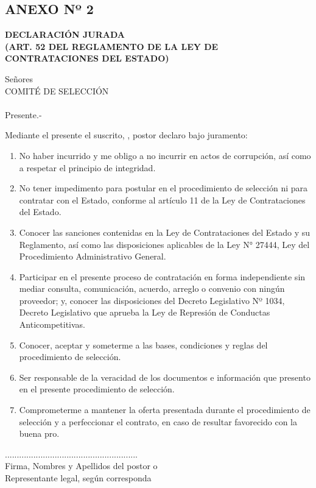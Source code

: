 \begin{center}
    \section*{ANEXO Nº 2}
    \textbf{DECLARACIÓN JURADA \\ (ART. 52 DEL REGLAMENTO DE LA LEY DE CONTRATACIONES DEL ESTADO)}
\end{center}
    
    Señores \\
    COMITÉ DE SELECCIÓN \\
    \nomenclatura \\
    Presente.-
    
    \vspace{0.5cm}
    
    Mediante el presente el suscrito, \textbf{\representante}, postor 
    declaro bajo juramento:
    
    \begin{enumerate}[label=\roman*.] %
        \item No haber incurrido y me obligo a no incurrir en actos de corrupción, así como a respetar el principio de integridad.
        \item No tener impedimento para postular en el procedimiento de selección ni para contratar con el Estado, conforme al artículo 11 de la Ley de Contrataciones del Estado.
        \item Conocer las sanciones contenidas en la Ley de Contrataciones del Estado y su Reglamento, así como las disposiciones aplicables de la Ley N° 27444, Ley del Procedimiento Administrativo General.
        \item Participar en el presente proceso de contratación en forma independiente sin mediar consulta, comunicación, acuerdo, arreglo o convenio con ningún proveedor; y, conocer las disposiciones del Decreto Legislativo Nº 1034, Decreto Legislativo que aprueba la Ley de Represión de Conductas Anticompetitivas.
        \item Conocer, aceptar y someterme a las bases, condiciones y reglas del procedimiento de selección.
        \item Ser responsable de la veracidad de los documentos e información que presento en el presente procedimiento de selección.
        \item Comprometerme a mantener la oferta presentada durante el procedimiento de selección y a perfeccionar el contrato, en caso de resultar favorecido con la buena pro.
    \end{enumerate}
    
    \vspace{0.5cm}
    
    \fecha 
    
    \vspace{2cm}
    
    \begin{center}
    ........................................................\\
    Firma, Nombres y Apellidos del postor o \\ 
    Representante legal, según corresponda
    \end{center}